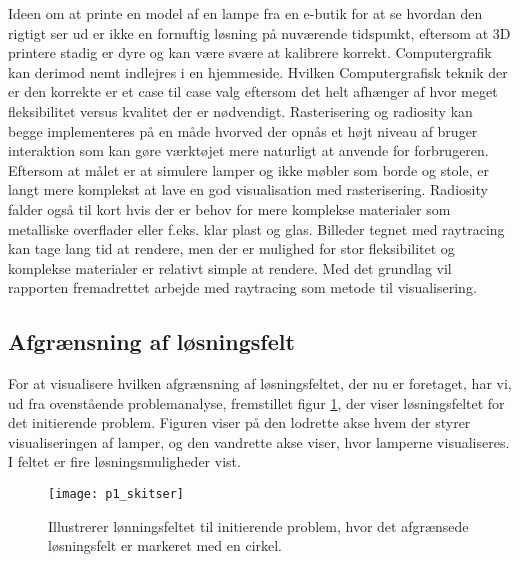 Ideen om at printe en model af en lampe fra en e-butik for at se hvordan den rigtigt ser ud er ikke en fornuftig løsning på nuværende tidspunkt, eftersom at 3D printere stadig er dyre og kan være svære at kalibrere korrekt. Computergrafik kan derimod nemt indlejres i en hjemmeside. Hvilken Computergrafisk teknik der er den korrekte er et case til case valg eftersom det helt afhænger af hvor meget fleksibilitet versus kvalitet der er nødvendigt. Rasterisering og radiosity kan begge implementeres på en måde hvorved der opnås et højt niveau af bruger interaktion som kan gøre værktøjet mere naturligt at anvende for forbrugeren. Eftersom at målet er at simulere lamper og ikke møbler som borde og stole, er langt mere komplekst at lave en god visualisation med rasterisering. Radiosity falder også til kort hvis der er behov for mere komplekse materialer som metalliske overflader eller f.eks. klar plast og glas. Billeder tegnet med raytracing kan tage lang tid at rendere, men der er mulighed for stor fleksibilitet og komplekse materialer er relativt simple at rendere. Med det grundlag vil rapporten fremadrettet arbejde med raytracing som metode til visualisering.

\subsection{Afgrænsning af løsningsfelt}
For at visualisere hvilken afgrænsning af løsningsfeltet, der nu er foretaget, har vi, ud fra ovenstående problemanalyse, fremstillet figur \ref{fig:p1_skitser}, der viser løsningsfeltet for det initierende problem. Figuren viser på den lodrette akse hvem der styrer visualiseringen af lamper, og den vandrette akse viser, hvor lamperne visualiseres. I feltet er fire løsningsmuligheder vist.

\begin{figure}[H]
  
  \centering
  \texttt{[image: p1\_skitser]}
  \caption{Illustrerer lønningsfeltet til initierende problem, hvor det afgrænsede løsningsfelt er markeret med en cirkel.}
  \label{fig:p1_skitser}
\end{figure}

